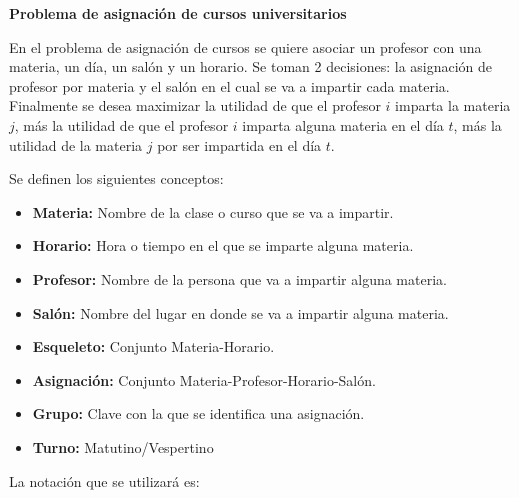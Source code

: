 \documentclass[12pt,spanish]{report}
\begin{document}
\begin{center}
\textbf{Problema de asignación de cursos universitarios}
\end{center}

En el problema de asignación de cursos se quiere asociar un profesor con una materia, un día, un salón y un horario. Se toman 2 decisiones: la asignación de profesor por materia y el salón en el cual se va a impartir cada materia. Finalmente se desea maximizar la utilidad de que el profesor $i$ imparta la materia $j$, más la utilidad de que el profesor $i$ imparta alguna materia en el día $t$, más la utilidad de la materia $j$ por ser impartida en el día $t$.

Se definen los siguientes conceptos:

\begin{itemize}
\item[ ] \textbf{Materia: } Nombre de la clase o curso que se va a impartir.

\item[ ] \textbf{Horario: } Hora o tiempo en el que se imparte alguna materia.

\item[ ] \textbf{Profesor: } Nombre de la persona que va a impartir alguna materia.

\item[ ] \textbf{Salón: } Nombre del lugar en donde se va a impartir alguna materia.

\item[ ] \textbf{Esqueleto: } Conjunto Materia-Horario.

\item[ ] \textbf{Asignación: } Conjunto Materia-Profesor-Horario-Salón.

\item[ ] \textbf{Grupo: } Clave con la que se identifica una asignación.

\item[ ] \textbf{Turno: } Matutino/Vespertino
\end{itemize}

La notación que se utilizará es:
\end{document}

